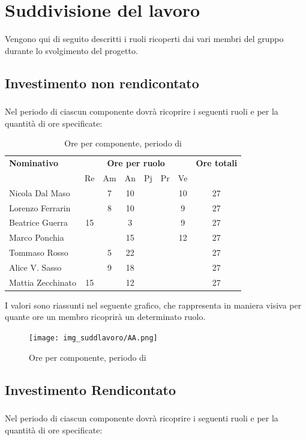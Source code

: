 \section{Suddivisione del lavoro}
Vengono qui di seguito descritti i ruoli ricoperti dai vari membri del gruppo durante lo svolgimento del progetto.
\subsection{Investimento non rendicontato}
\subsubsection{\AR}
Nel periodo di \AR{} ciascun componente dovrà ricoprire i seguenti ruoli e per la quantità di ore specificate:

\begin{table}[H]
	\centering
	\begin{tabular}{|l|c|c|c|c|c|c|c|}
		\hline
		\textbf{Nominativo} & 
		\multicolumn{6}{c|}{\textbf{Ore per ruolo}} & 
		\textbf{Ore totali} \\
		& Re & Am & An & Pj & Pr & Ve & \\
		\hline
		Nicola Dal Maso & & 7 & 10 & & & 10 & 27 \\
		Lorenzo Ferrarin & & 8 & 10 & & & 9 & 27 \\
		Beatrice Guerra & 15 & & 3 & & & 9 & 27 \\
		Marco Ponchia & & & 15 & & & 12 & 27 \\
		Tommaso Rosso & & 5 & 22 & & & & 27 \\
		Alice V. Sasso & & 9 & 18 & & & & 27 \\
		Mattia Zecchinato & 15 & & 12 & & & & 27 \\
		\hline
	\end{tabular}
	\caption{Ore per componente, periodo di \AR{}}
\end{table}
I valori sono riassunti nel seguente grafico, che rappresenta in maniera visiva per quante ore un membro ricoprirà un determinato ruolo.
\begin{figure}[H]
	\centering
	\texttt{[image: img\_suddlavoro/AA.png]}
	\caption{Ore per componente, periodo di \AR{}}
\end{figure}

\subsection{Investimento Rendicontato}
\subsubsection{\AD}
Nel periodo di \AD{} ciascun componente dovrà ricoprire i seguenti ruoli e per la quantità di ore specificate:

